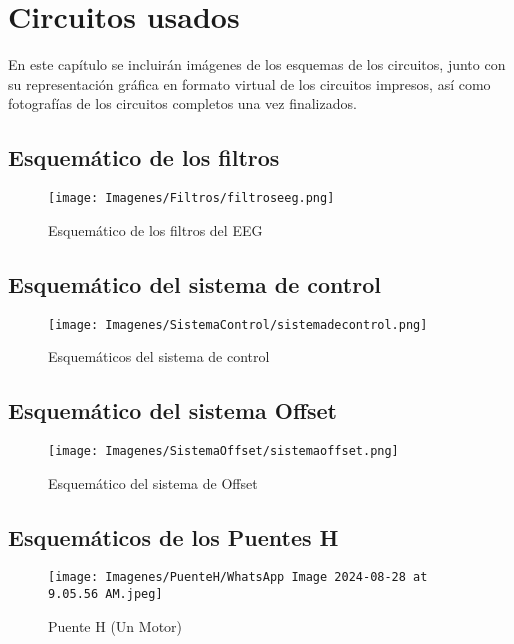 \documentclass{article}
\begin{document}
\newpage

\section{Circuitos usados}
En este capítulo se incluirán imágenes de los esquemas de los circuitos, junto con su representación gráfica en formato virtual de los circuitos impresos, así como fotografías de los circuitos completos una vez finalizados.


\subsection{Esquemático de los filtros}
\begin{figure}[H]
    \centering
    \texttt{[image: Imagenes/Filtros/filtroseeg.png]}
    \caption{Esquemático de los filtros del EEG}
\end{figure}

\subsection{Esquemático del sistema de control}
\begin{figure}[H]
    \centering
    \texttt{[image: Imagenes/SistemaControl/sistemadecontrol.png]}
    \caption{Esquemáticos del sistema de control}
\end{figure}

\subsection{Esquemático del sistema Offset}
\begin{figure}[H]
    \centering
    \texttt{[image: Imagenes/SistemaOffset/sistemaoffset.png]}
    \caption{Esquemático del sistema de Offset}
\end{figure}

\subsection{Esquemáticos de los Puentes H}
\begin{figure}[H]
    \centering
     \texttt{[image: Imagenes/PuenteH/WhatsApp Image 2024-08-28 at 9.05.56 AM.jpeg]}
    \caption{Puente H (Un Motor)}
\end{figure}
\end{document}

